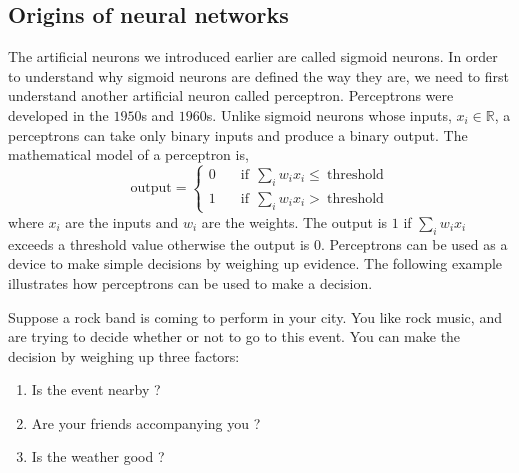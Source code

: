 \subsection{Origins of neural networks}
The artificial neurons we introduced earlier are called sigmoid neurons. In order to understand 
why sigmoid neurons are defined the way they are, we need to first understand another artificial 
neuron called perceptron. Perceptrons were developed in the $1950$s and $1960$s. Unlike sigmoid neurons 
whose inputs, $x_i \in \mathbb{R}$, a perceptrons can take only binary inputs and produce a binary output.
The mathematical model of a perceptron is,
\begin{equation*}
    \text{output} = 
     \begin{cases}
       0 &\quad \text{if} \ \ \sum_i w_i x_i \leq \ \text{threshold} \\
       1 &\quad  \text{if} \ \ \sum_i w_i x_i > \ \text{threshold} 
     \end{cases}
\end{equation*}
where $x_i$ are the inputs and $w_i$ are the weights. The output is $1$ if $\sum_i w_i x_i$ exceeds a threshold 
value otherwise the output is $0$. Perceptrons can be used as a device to make simple decisions by weighing up evidence. 
The following example illustrates how perceptrons can be used to make a decision.
\begin{boxedexample}
    Suppose a rock band is coming to perform in your city. You like rock music, and are trying to 
    decide whether or not to go to this event. You can make the decision by weighing up three factors:
   \begin{enumerate}
    \item Is the event nearby ?
    \item Are your friends accompanying you ?
    \item Is the weather good ?
   \end{enumerate}
\end{boxedexample}

